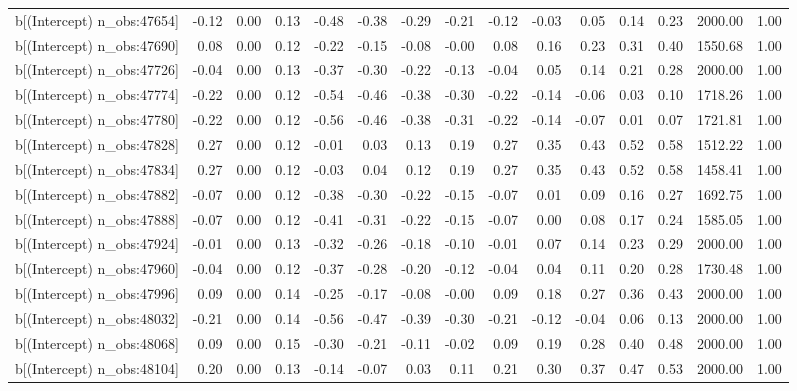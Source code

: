 \begin{table}[ht]
\begin{tabular}{rrrrrrrrrrrrrrr}
  b[(Intercept) n\_obs:47654] & -0.12 & 0.00 & 0.13 & -0.48 & -0.38 & -0.29 & -0.21 & -0.12 & -0.03 & 0.05 & 0.14 & 0.23 & 2000.00 & 1.00 \\ 
  b[(Intercept) n\_obs:47690] & 0.08 & 0.00 & 0.12 & -0.22 & -0.15 & -0.08 & -0.00 & 0.08 & 0.16 & 0.23 & 0.31 & 0.40 & 1550.68 & 1.00 \\ 
  b[(Intercept) n\_obs:47726] & -0.04 & 0.00 & 0.13 & -0.37 & -0.30 & -0.22 & -0.13 & -0.04 & 0.05 & 0.14 & 0.21 & 0.28 & 2000.00 & 1.00 \\ 
  b[(Intercept) n\_obs:47774] & -0.22 & 0.00 & 0.12 & -0.54 & -0.46 & -0.38 & -0.30 & -0.22 & -0.14 & -0.06 & 0.03 & 0.10 & 1718.26 & 1.00 \\ 
  b[(Intercept) n\_obs:47780] & -0.22 & 0.00 & 0.12 & -0.56 & -0.46 & -0.38 & -0.31 & -0.22 & -0.14 & -0.07 & 0.01 & 0.07 & 1721.81 & 1.00 \\ 
  b[(Intercept) n\_obs:47828] & 0.27 & 0.00 & 0.12 & -0.01 & 0.03 & 0.13 & 0.19 & 0.27 & 0.35 & 0.43 & 0.52 & 0.58 & 1512.22 & 1.00 \\ 
  b[(Intercept) n\_obs:47834] & 0.27 & 0.00 & 0.12 & -0.03 & 0.04 & 0.12 & 0.19 & 0.27 & 0.35 & 0.43 & 0.52 & 0.58 & 1458.41 & 1.00 \\ 
  b[(Intercept) n\_obs:47882] & -0.07 & 0.00 & 0.12 & -0.38 & -0.30 & -0.22 & -0.15 & -0.07 & 0.01 & 0.09 & 0.16 & 0.27 & 1692.75 & 1.00 \\ 
  b[(Intercept) n\_obs:47888] & -0.07 & 0.00 & 0.12 & -0.41 & -0.31 & -0.22 & -0.15 & -0.07 & 0.00 & 0.08 & 0.17 & 0.24 & 1585.05 & 1.00 \\ 
  b[(Intercept) n\_obs:47924] & -0.01 & 0.00 & 0.13 & -0.32 & -0.26 & -0.18 & -0.10 & -0.01 & 0.07 & 0.14 & 0.23 & 0.29 & 2000.00 & 1.00 \\ 
  b[(Intercept) n\_obs:47960] & -0.04 & 0.00 & 0.12 & -0.37 & -0.28 & -0.20 & -0.12 & -0.04 & 0.04 & 0.11 & 0.20 & 0.28 & 1730.48 & 1.00 \\ 
  b[(Intercept) n\_obs:47996] & 0.09 & 0.00 & 0.14 & -0.25 & -0.17 & -0.08 & -0.00 & 0.09 & 0.18 & 0.27 & 0.36 & 0.43 & 2000.00 & 1.00 \\ 
  b[(Intercept) n\_obs:48032] & -0.21 & 0.00 & 0.14 & -0.56 & -0.47 & -0.39 & -0.30 & -0.21 & -0.12 & -0.04 & 0.06 & 0.13 & 2000.00 & 1.00 \\ 
  b[(Intercept) n\_obs:48068] & 0.09 & 0.00 & 0.15 & -0.30 & -0.21 & -0.11 & -0.02 & 0.09 & 0.19 & 0.28 & 0.40 & 0.48 & 2000.00 & 1.00 \\ 
  b[(Intercept) n\_obs:48104] & 0.20 & 0.00 & 0.13 & -0.14 & -0.07 & 0.03 & 0.11 & 0.21 & 0.30 & 0.37 & 0.47 & 0.53 & 2000.00 & 1.00 \\ 

\end{tabular}
\end{table}
